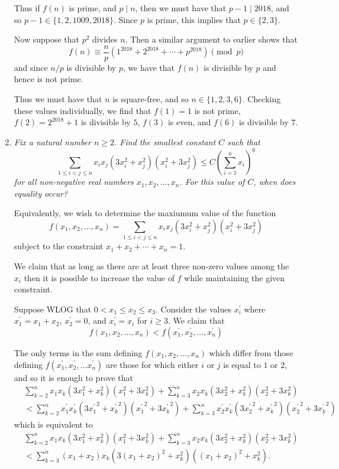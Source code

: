 \documentclass{article}
\begin{document}
\begin{enumerate}[1.]
Thus if $f(n)$ is prime, and $p \mid n$, then we must have that $p - 1 \mid 2018$, and so $p - 1 \in \{1, 2, 1009, 2018\}$. Since $p$ is prime, this implies that $p \in \{2, 3\}$.

Now suppose that $p^2$ divides $n$. Then a similar argument to earlier shows that
\[
	f(n) \equiv \frac{n}{p} \left( 1^{2018} + 2^{2018} + \cdots + p^{2018} \right) \pmod p
\]
and since $n/p$ is divisible by $p$, we have that $f(n)$ is divisible by $p$ and hence is not prime.

Thus we must have that $n$ is square-free, and so $n \in \{1, 2, 3, 6\}$. Checking these values individually, we find that $f(1) = 1$ is not prime, $f(2) = 2^{2018} + 1$ is divisible by $5$, $f(3)$ is even, and $f(6)$ is divisible by $7$.


\vspace{6pt}
\item %
\textit{Fix a natural number $n \geq 2$. Find the smallest constant $C$ such that
\[
	 \sum_{1 \leq i < j \leq n} x_i x_j (3x_i^2 + x_j^2)(x_i^2 + 3x_j^2) \leq C {\left( \sum_{i = 1}^{n} x_i \right)}^6
\]
for all non-negative real numbers $x_1, x_2, \dots, x_n$. For this value of $C$, when does equality occur?}

Equivalently, we wish to determine the maxiumum value of the function
\[
	f(x_1, x_2, \dots, x_n) = \sum_{1 \leq i < j \leq n} x_i x_j (3x_i^2 + x_j^2)(x_i^2 + 3x_j^2)
\]
subject to the constraint $x_1 + x_2 + \cdots + x_n = 1$.

We claim that as long as there are at least three non-zero values among the $x_i$ then it is possible to increase the value of $f$ while maintaining the given constraint.

Suppose WLOG that $0 < x_1 \leq x_2 \leq x_3$. Consider the values $x_i^\prime$ where $x_1^\prime = x_1 + x_2$, $x_2^\prime = 0$, and $x_i^\prime = x_i$ for $i \geq 3$. We claim that
\[
	f(x_1, x_2, \dots, x_n) < f(x_1^\prime, x_2^\prime, \dots, x_n^\prime)
\]

The only terms in the sum defining $f(x_1, x_2, \dots, x_n)$ which differ from those defining $f(x_1^\prime, x_2^\prime, \dots x_n^\prime)$ are those for which either $i$ or $j$ is equal to $1$ or $2$, and so it is enough to prove that
\begin{align*}
	& \sum_{k = 2}^{n} x_1 x_k (3x_1^2 + x_k^2)(x_1^2 + 3x_k^2) + \sum_{k = 3}^{n} x_2 x_k (3x_2^2 + x_k^2)(x_2^2 + 3x_k^2) \\
	& <	\sum_{k = 2}^{n} x_1^\prime x_k^\prime (3{x_1^\prime}^2 + {x_k^\prime}^2)({x_1^\prime}^2 + 3{x_k^\prime}^2) + \sum_{k = 3}^{n} x_2^\prime x_k^\prime (3{x_2^\prime}^2 + {x_k^\prime}^2)({x_2^\prime}^2 + 3{x_k^\prime}^2)
\end{align*}
which is equivalent to
\begin{align*}
	& \sum_{k = 2}^{n} x_1 x_k (3x_1^2 + x_k^2)(x_1^2 + 3x_k^2) + \sum_{k = 3}^{n} x_2 x_k (3x_2^2 + x_k^2)(x_2^2 + 3x_k^2) \\
	& < \sum_{k = 3}^{n} (x_1 + x_2) x_k (3{(x_1 + x_2)}^2 + x_k^2)({(x_1 + x_2)}^2 + x_k^2).
\end{align*}


\end{enumerate}
\end{document}
